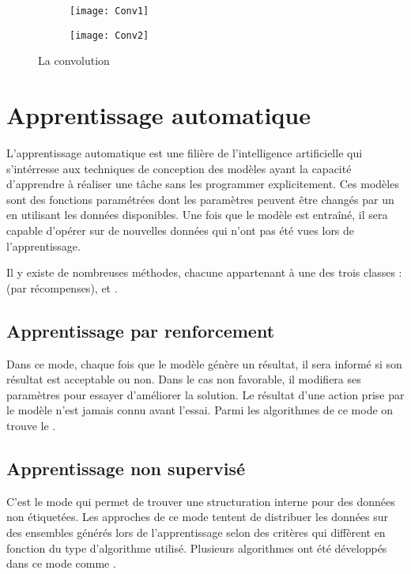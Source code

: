 \begin{figure}[h]
\begin{subfigure}{0.49\textwidth}
\texttt{[image: Conv1]}
\end{subfigure}
\hfill
\begin{subfigure}{0.49\textwidth}
\texttt{[image: Conv2]}
\end{subfigure}
\caption{La convolution}{\cite{commonsConvolution}}
\end{figure}

\section{Apprentissage automatique}

L'apprentissage automatique est une filière de
l'intelligence artificielle qui s'intérresse aux techniques de conception des
modèles ayant la capacité d'apprendre à réaliser une tâche sans les programmer
explicitement. Ces modèles sont des fonctions paramétrées dont les paramètres
peuvent être changés par un  en utilisant les données
disponibles. Une fois que le modèle est entraîné, il sera capable d'opérer sur
de nouvelles données qui n'ont pas été vues lors de l'apprentissage.

Il y existe de nombreuses méthodes, chacune appartenant à
une des trois classes :
 (par récompenses),
 et
.

\subsection{Apprentissage par renforcement}

Dans ce mode, chaque fois que le modèle génère un résultat, il sera informé
si son résultat est acceptable ou non. Dans le cas non favorable, il modifiera
ses paramètres pour essayer d'améliorer la solution. Le résultat d'une action
prise par le modèle n'est jamais connu avant l'essai. Parmi les algorithmes de ce
mode on trouve le .

\subsection{Apprentissage non supervisé}

C'est le mode qui permet de trouver une structuration interne pour des données
non étiquetées. Les approches de ce mode tentent de distribuer les données sur
des ensembles générés lors de l'apprentissage selon des critères qui diffèrent
en fonction du type d'algorithme utilisé. Plusieurs algorithmes ont été
développés dans ce mode comme .

